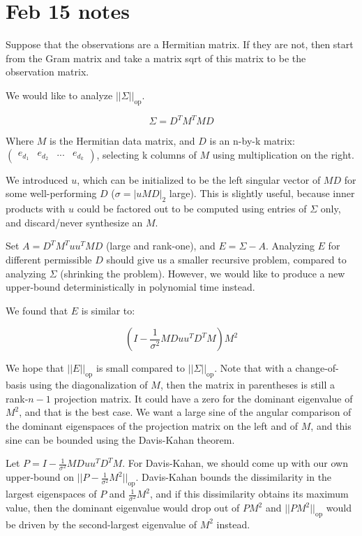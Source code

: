 \documentclass{article}
\begin{document}
\section{Feb 15 notes}

Suppose that the observations are a Hermitian matrix. If they are not, then start from the Gram matrix and take a matrix sqrt of this matrix to be the observation matrix.

We would like to analyze $||\Sigma||_\text{op}$.

$$\Sigma = D^T M^T M D$$

Where $M$ is the Hermitian data matrix, and $D$ is an n-by-k matrix:\\ $\left(\begin{matrix} e_{d_1} & e_{d_2} & ... & e_{d_k} \end{matrix}\right)$, selecting k columns of $M$ using multiplication on the right.

We introduced $u$, which can be initialized to be the left singular vector of $MD$ for some well-performing $D$ ($\sigma = |uMD|_2$ large). This is slightly useful, because inner products with $u$ could be factored out to be computed using entries of $\Sigma$ only, and discard/never synthesize an $M$.

Set $A = D^T M^T u u^T M D$ (large and rank-one), and $E = \Sigma - A$. Analyzing $E$ for different permissible $D$ should give us a smaller recursive problem, compared to analyzing $\Sigma$ (shrinking the problem). However, we would like to produce a new upper-bound deterministically in polynomial time instead.

We found that $E$ is similar to:

$$(I - \frac{1}{\sigma^2} M D u u^T D^T M) M^2$$

We hope that $||E||_\text{op}$ is small compared to $||\Sigma||_\text{op}$. Note that with a change-of-basis using the diagonalization of $M$, then the matrix in parentheses is still a rank-$n-1$ projection matrix. It could have a zero for the dominant eigenvalue of $M^2$, and that is the best case. We want a large sine of the angular comparison of the dominant eigenspaces of the projection matrix on the left and of $M$, and this sine can be bounded using the Davis-Kahan theorem.

Let $P = I - \frac{1}{\sigma^2} MDu u^T D^T M$. For Davis-Kahan, we should come up with our own upper-bound on $||P - \frac{1}{\sigma^2} M^2||_\text{op}$. Davis-Kahan bounds the dissimilarity in the largest eigenspaces of $P$ and $\frac{1}{\sigma^2} M^2$, and if this dissimilarity obtains its maximum value, then the dominant eigenvalue would drop out of $PM^2$ and $||PM^2||_\text{op}$ would be driven by the second-largest eigenvalue of $M^2$ instead.
\end{document}
